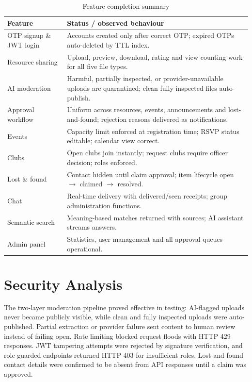 \documentclass[12pt,a4paper]{report}
\begin{document}
\begin{table}[htbp]
\centering
\caption{Feature completion summary}
\label{tab:results}
\begin{tabular}{@{}p{5.2cm}p{8.2cm}@{}}
\toprule
\textbf{Feature} & \textbf{Status / observed behaviour} \\
\midrule
OTP signup \& JWT login & Accounts created only after correct OTP;
  expired OTPs auto-deleted by TTL index. \\
Resource sharing & Upload, preview, download, rating and view
  counting work for all five file types. \\
AI moderation & Harmful, partially inspected, or provider-unavailable
  uploads are quarantined; clean fully inspected files auto-publish. \\
Approval workflow & Uniform across resources, events, announcements
  and lost-and-found; rejection reasons delivered as
  notifications. \\
Events & Capacity limit enforced at registration time; RSVP status
  editable; calendar view correct. \\
Clubs & Open clubs join instantly; request clubs require officer
  decision; roles enforced. \\
Lost \& found & Contact hidden until claim approval; item lifecycle
  open $\rightarrow$ claimed $\rightarrow$ resolved. \\
Chat & Real-time delivery with delivered/seen receipts; group
  administration functions. \\
Semantic search & Meaning-based matches returned with sources; AI
  assistant streams answers. \\
Admin panel & Statistics, user management and all approval queues
  operational. \\
\bottomrule
\end{tabular}
\end{table}

\section{Security Analysis}
The two-layer moderation pipeline proved effective in testing:
AI-flagged uploads never became publicly visible, while clean and
fully inspected uploads were auto-published. Partial extraction or
provider failure sent content to human review instead of failing
open. Rate limiting blocked request floods with HTTP 429 responses.
JWT tampering attempts were
rejected by signature verification, and role-guarded endpoints
returned HTTP 403 for insufficient roles. Lost-and-found contact
details were confirmed to be absent from API responses until a claim
was approved.
\end{document}
